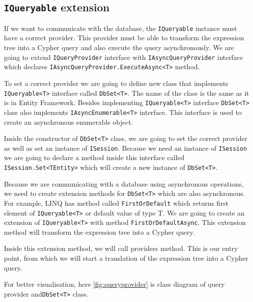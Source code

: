 \subsection{\texttt{IQueryable} extension}

If we want to communicate with the database, the \texttt{IQueryable} instance must have a correct provider.
This provider must be able to transform the expression tree into a Cypher query and also execute the query asynchronously. We are going to extend \texttt{IQueryProvider} interface
with \texttt{IAsyncQueryProvider} interface which declares \texttt{IAsyncQueryProvider.ExecuteAsync<T>} method.

To set a correct provider we are going to define new class that implements \texttt{IQueryable<T>} interface called \texttt{DbSet<T>}.
The name of the class is the same as it is in Entity Framework. Besides implementing \texttt{IQueryable<T>} interface \texttt{DbSet<T>} class also implements
\texttt{IAsyncEnumerable<T>} interface. This interface is used to create an asynchronous enumerable object.

Inside the constructor of \texttt{DbSet<T>} class, we are going to set the correct provider as well as set an instance of \texttt{ISession}.
Because we need an instance of \texttt{ISession} we are going to declare a method inside this interface called
\texttt{ISession.Set<TEntity>} which will create a new instance
of \texttt{DbSet<T>}.

Because we are communicating with a database using asynchronous operations, we need to create extension methods for \texttt{DbSet<T>} which are also asynchronous.
For example, LINQ has method called \texttt{FirstOrDefault} which returns first element of \texttt{IQueryable<T>} or default value of type T. We are going to create
an extension of \texttt{IQueryable<T>} with method \texttt{FirstOrDefaultAsync}. This extension method will transform the expression tree into a Cypher query.

Inside this extension method, we will call providers\linebreak
{} method. This is our entry point, from which we will start a translation
of the expression tree into a Cypher query.

For better visualisation, here \ref{fig:queryprovider} is class diagram of query provider and\linebreak\texttt{DbSet<T>} class.

